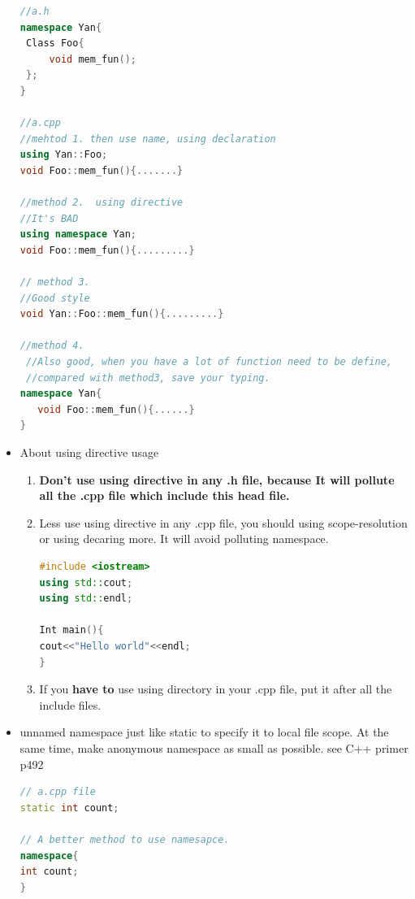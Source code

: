 \documentclass[a4paper,12pt,twoside]{book}
\begin{document}
\begin{itemize}
\begin{lstlisting}[frame=single, language=c++]
//a.h
namespace Yan{
 Class Foo{
     void mem_fun();
 };
}

//a.cpp
//mehtod 1. then use name, using declaration
using Yan::Foo;
void Foo::mem_fun(){.......}

//method 2.  using directive
//It's BAD
using namespace Yan;
void Foo::mem_fun(){.........}

// method 3.
//Good style
void Yan::Foo::mem_fun(){.........}

//method 4.
 //Also good, when you have a lot of function need to be define,
 //compared with method3, save your typing.
namespace Yan{
   void Foo::mem_fun(){......}
}
\end{lstlisting}

\item About using directive usage
\begin{enumerate}
\item  \textbf{Don't use using directive in any .h file,  because It will pollute all the .cpp file which include this head file.}

\item  Less use using directive in any .cpp file, you should using scope-resolution or using decaring more. It will avoid polluting namespace.
\begin{lstlisting}[frame=single, language=c++]
#include <iostream>
using std::cout;
using std::endl;

Int main(){
cout<<"Hello world"<<endl;
}
\end{lstlisting}

\item If you \textbf{have to} use using directory in your .cpp file, put it after all the include files.
\end{enumerate}

\item unnamed namespace just like static to specify it to local file scope. At the same time, make anonymous namespace as small as possible.  see C++ primer p492
\begin{lstlisting}[frame=single, language=c++]
// a.cpp file
static int count;

// A better method to use namesapce.
namespace{
int count;
}
\end{lstlisting}

\end{itemize}
\end{document}
